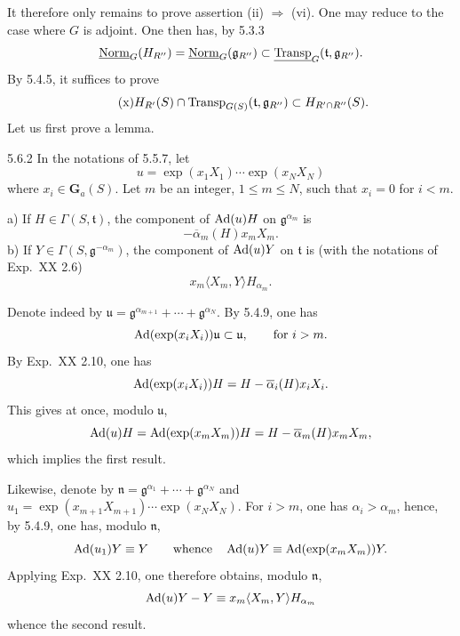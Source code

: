 It therefore only remains to prove assertion (ii) $\Rightarrow$ (vi). One may reduce to the case where $G$ is adjoint. One then has, by 5.3.3
\[
\underline{\mathrm{Norm}}_G(H_{R''})=\underline{\mathrm{Norm}}_G(\mathfrak g_{R''})\subset\underline{\operatorname{Transp}}_G(\mathfrak t,\mathfrak g_{R''}).
\]
{\renewcommand{\thefootnote}{(39)}}%
By 5.4.5, it suffices to prove
\begin{equation}\tag{x}\label{XXII.eq.x}
H_{R'}(S)\cap\operatorname{Transp}_{G(S)}(\mathfrak t,\mathfrak g_{R''})\subset H_{R'\cap R''}(S).
\end{equation}
Let us first prove a lemma.
\begin{lemma}{5.6.2}\label{XXII.5.6.2}
In the notations of 5.5.7, let
\[
u=\exp(x_1X_1)\cdots\exp(x_NX_N)
\]
where $x_i\in\mathbf G_a(S)$. Let $m$ be an integer, $1\le m\le N$, such that $x_i=0$ for $i<m$.

a) If $H\in\Gamma(S,\mathfrak t)$, the component of $\operatorname{Ad}(u)H$ on $\mathfrak g^{\alpha_m}$ is
\[
-\overline\alpha_m(H)x_mX_m.
\]
b) If $Y\in\Gamma(S,\mathfrak g^{-\alpha_m})$, the component of $\operatorname{Ad}(u)Y$ on $\mathfrak t$ is (with the notations of Exp.~XX 2.6)
\[
x_m\langle X_m,Y\rangle H_{\alpha_m}.
\]
\end{lemma}
Denote indeed by $\mathfrak u=\mathfrak g^{\alpha_{m+1}}+\cdots+\mathfrak g^{\alpha_N}$. By 5.4.9, one has
\[
\operatorname{Ad}(\exp(x_iX_i))\mathfrak u\subset\mathfrak u,\qquad\text{for }i>m.
\]
By Exp.~XX 2.10, one has
\[
\operatorname{Ad}(\exp(x_iX_i))H=H-\overline\alpha_i(H)x_iX_i.
\]
This gives at once, modulo $\mathfrak u$,
\[
\operatorname{Ad}(u)H=\operatorname{Ad}(\exp(x_mX_m))H=H-\overline\alpha_m(H)x_mX_m,
\]
which implies the first result.

Likewise, denote{\renewcommand{\thefootnote}{(40)}} by $\mathfrak n=\mathfrak g^{\alpha_1}+\cdots+\mathfrak g^{\alpha_N}$ and $u_1=\exp(x_{m+1}X_{m+1})\cdots\exp(x_NX_N)$. For $i>m$, one has $\alpha_i>\alpha_m$, hence, by 5.4.9, one has, modulo $\mathfrak n$,
\[
\operatorname{Ad}(u_1)Y\equiv Y\qquad\text{whence}\quad\operatorname{Ad}(u)Y\equiv\operatorname{Ad}(\exp(x_mX_m))Y.
\]
Applying Exp.~XX 2.10, one therefore obtains, modulo $\mathfrak n$,
\[
\operatorname{Ad}(u)Y-Y\equiv x_m\langle X_m,Y\rangle H_{\alpha_m}
\]
whence the second result.

